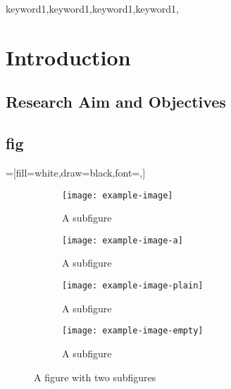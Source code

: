 \documentclass[
    writingLanguage=english, 
    addPageTitle=on,
    addDeclaration=on,
    addMUSTlog=off,
    printMod=off,
    refIndent=on,
    addFigTOC=on,
    addTabTOC=on,
]{.def/must}
\begin{document}
\begin{abstract@en}{keyword1,keyword1,keyword1,keyword1,}

\the\baselineskip
\end{abstract@en}

\addtableofcontents


\chapter{Introduction}
\section{Research Aim and Objectives}
\section{fig}
\captionsetup[figure]{singlelinecheck=off,justification=raggedright}
\captionsetup[subfigure]{singlelinecheck=on}
=[fill=white,draw=black,font=\small,]

\begin{figure}[H]
	\centering
	\begin{subfigure}{0.49\textwidth}
	  	\centering
            \texttt{[image: example-image]}
		\caption{A subfigure}
		\label{fig:sub1}
	\end{subfigure}
	\hfill
	\begin{subfigure}{.49\textwidth}
		\centering
            \texttt{[image: example-image-a]}
		\caption{A subfigure}
	  	\label{fig:sub2}
	\end{subfigure}
        \newline
	\begin{subfigure}{.49\textwidth}
		\centering
            \texttt{[image: example-image-plain]}
		\caption{A subfigure}
		\label{fig:sub3}
	\end{subfigure}
	\begin{subfigure}{.49\textwidth}
		\centering
            \texttt{[image: example-image-empty]}
		\caption{A subfigure}
		\label{fig:sub4}
	\end{subfigure}
	\caption{A figure with two subfigures}
	\label{fig:sub}
\end{figure}
\end{document}
